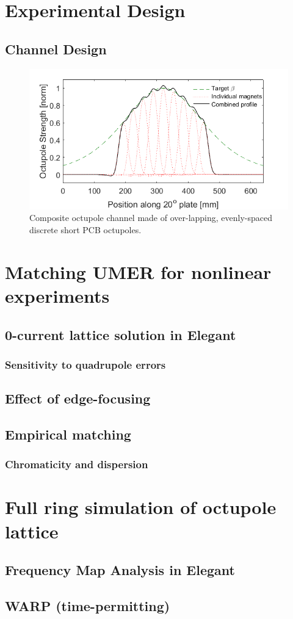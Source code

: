 
 

  
 \section{Experimental Design}
 \subsection{Channel Design}
 
\begin{figure}[]
\centering
\includegraphics[width=\textwidth]{7.figures/long_channel_N9_cleanedup.png}   
\caption{Composite octupole channel made of over-lapping, evenly-spaced discrete short PCB octupoles.}
\label{fig:octchannel}
\end{figure}  



\section{Matching UMER for nonlinear experiments}
\subsection{0-current lattice solution in Elegant}
\subsubsection{Sensitivity to quadrupole errors}
\subsection{Effect of edge-focusing}
\subsection{Empirical matching}
\subsubsection{Chromaticity and dispersion}





\section{Full ring simulation of octupole lattice}
\subsection{Frequency Map Analysis in Elegant}
\subsection{WARP (time-permitting)}

